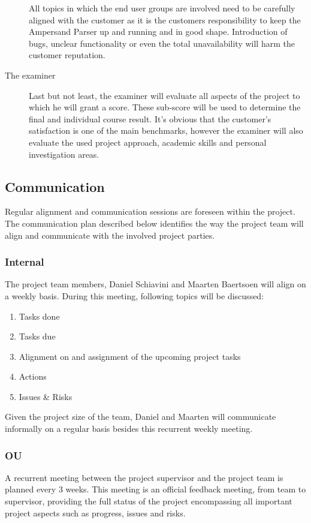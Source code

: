\begin{description}
	All topics in which the end user groups are involved need to be carefully aligned with the customer as it is the customers responsibility to keep the Ampersand Parser up and running and in good shape.
	Introduction of bugs, unclear functionality or even the total unavailability will harm the customer reputation.

	\item[The examiner]
	Last but not least, the examiner will evaluate all aspects of the project to which he will grant a score.
	These sub-score will be used to determine the final and individual course result.
	It's obvious that the customer's satisfaction is one of the main benchmarks, however the examiner will also evaluate the used project approach, academic skills and personal investigation areas.
\end {description}

\subsection{Communication}
\label{subsec:communication}
Regular alignment and communication sessions are foreseen within the project.
The communication plan described below identifies the way the project team will align and communicate with the involved project parties.

\subsubsection{Internal}
The project team members, Daniel Schiavini and Maarten Baertsoen will align on a weekly basis.
During this meeting, following topics will be discussed:
\begin{enumerate}
	\item Tasks done
	\item Tasks due
	\item Alignment on and assignment of the upcoming project tasks
	\item Actions
	\item Issues \& Risks
\end {enumerate}
%
Given the project size of the team, Daniel and Maarten will communicate informally on a regular basis besides this recurrent weekly meeting.

\subsubsection{OU}
%
A recurrent meeting between the project supervisor and the project team is planned every 3 weeks.
This meeting is an official feedback meeting, from team to supervisor, providing the full status of the project encompassing all important project aspects such as progress, issues and risks.

